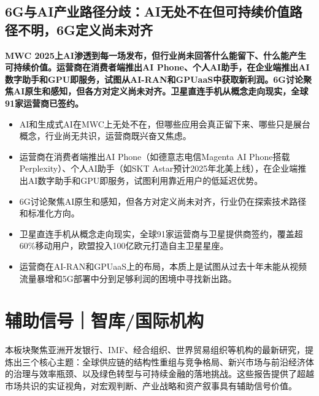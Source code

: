 \documentclass[11pt]{ctexart}
\begin{document}
\subsection{6G与AI产业路径分歧：AI无处不在但可持续价值路径不明，6G定义尚未对齐}
\textbf{MWC 2025上AI渗透到每一场发布，但行业尚未回答什么能留下、什么能产生可持续价值。运营商在消费者端推出AI Phone、个人AI助手，在企业端推出AI数字助手和GPU即服务，试图从AI-RAN和GPUaaS中获取新利润。6G讨论聚焦AI原生和感知，但各方对定义尚未对齐。卫星直连手机从概念走向现实，全球91家运营商已签约。}
\begin{itemize}
  \item AI和生成式AI在MWC上无处不在，但哪些应用会真正留下来、哪些只是展台概念，行业尚无共识，运营商既兴奋又焦虑。
  \item 运营商在消费者端推出AI Phone（如德意志电信Magenta AI Phone搭载Perplexity）、个人AI助手（如SKT Astar预计2025年北美上线），在企业端推出AI数字助手和GPU即服务，试图利用靠近用户的低延迟优势。
  \item 6G讨论聚焦AI原生和感知，但各方对定义尚未对齐，行业仍在探索技术路径和标准化方向。
  \item 卫星直连手机从概念走向现实，全球91家运营商与卫星提供商签约，覆盖超60\%移动用户，欧盟投入100亿欧元打造自主卫星星座。
  \item 运营商在AI-RAN和GPUaaS上的布局，本质上是试图从过去十年未能从视频流量暴增和5G部署中分到足够利润的困境中寻找新出路。
\end{itemize}
\newpage
\section{辅助信号｜智库/国际机构}
本板块聚焦亚洲开发银行、IMF、经合组织、世界贸易组织等机构的最新研究，提炼出三个核心主题：全球供应链的结构性重组与竞争格局、新兴市场与前沿经济体的治理与效率瓶颈、以及绿色转型与可持续金融的落地挑战。这些报告提供了超越市场共识的实证视角，对宏观判断、产业战略和资产叙事具有辅助信号价值。
\end{document}
